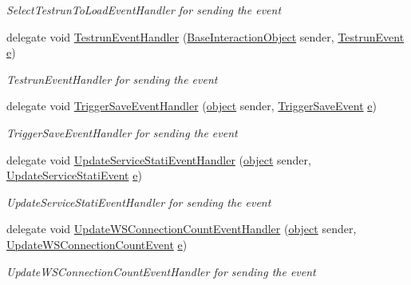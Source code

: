 \begin{DoxyCompactItemize}
\begin{DoxyCompactList}\small\item\em Select\+Testrun\+To\+Load\+Event\+Handler for sending the event \end{DoxyCompactList}\item 
delegate void \hyperlink{namespace_web_analyzer_1_1_events_ac749d30657662c0b107ea3e49caae8d9}{Testrun\+Event\+Handler} (\hyperlink{class_web_analyzer_1_1_u_i_1_1_interaction_objects_1_1_base_interaction_object}{Base\+Interaction\+Object} sender, \hyperlink{class_web_analyzer_1_1_events_1_1_testrun_event}{Testrun\+Event} \hyperlink{_u_i_2_h_t_m_l_resources_2js_2lib_2bootstrap_8min_8js_ab5902775854a8b8440bcd25e0fe1c120}{e})
\begin{DoxyCompactList}\small\item\em Testrun\+Event\+Handler for sending the event \end{DoxyCompactList}\item 
delegate void \hyperlink{namespace_web_analyzer_1_1_events_a8e8e2ff467a5d5522ce9d3df28198ccf}{Trigger\+Save\+Event\+Handler} (\hyperlink{_u_i_2_h_t_m_l_resources_2js_2lib_2underscore_8min_8js_aae18b7515bb2bc4137586506e7c0c903}{object} sender, \hyperlink{class_web_analyzer_1_1_events_1_1_trigger_save_event}{Trigger\+Save\+Event} \hyperlink{_u_i_2_h_t_m_l_resources_2js_2lib_2bootstrap_8min_8js_ab5902775854a8b8440bcd25e0fe1c120}{e})
\begin{DoxyCompactList}\small\item\em Trigger\+Save\+Event\+Handler for sending the event \end{DoxyCompactList}\item 
delegate void \hyperlink{namespace_web_analyzer_1_1_events_ab82c3a878b6c73019388a394527e6306}{Update\+Service\+Stati\+Event\+Handler} (\hyperlink{_u_i_2_h_t_m_l_resources_2js_2lib_2underscore_8min_8js_aae18b7515bb2bc4137586506e7c0c903}{object} sender, \hyperlink{class_web_analyzer_1_1_events_1_1_update_service_stati_event}{Update\+Service\+Stati\+Event} \hyperlink{_u_i_2_h_t_m_l_resources_2js_2lib_2bootstrap_8min_8js_ab5902775854a8b8440bcd25e0fe1c120}{e})
\begin{DoxyCompactList}\small\item\em Update\+Service\+Stati\+Event\+Handler for sending the event \end{DoxyCompactList}\item 
delegate void \hyperlink{namespace_web_analyzer_1_1_events_a60ab58d669ec03a2518a57dba5a59e0e}{Update\+W\+S\+Connection\+Count\+Event\+Handler} (\hyperlink{_u_i_2_h_t_m_l_resources_2js_2lib_2underscore_8min_8js_aae18b7515bb2bc4137586506e7c0c903}{object} sender, \hyperlink{class_web_analyzer_1_1_events_1_1_update_w_s_connection_count_event}{Update\+W\+S\+Connection\+Count\+Event} \hyperlink{_u_i_2_h_t_m_l_resources_2js_2lib_2bootstrap_8min_8js_ab5902775854a8b8440bcd25e0fe1c120}{e})
\begin{DoxyCompactList}\small\item\em Update\+W\+S\+Connection\+Count\+Event\+Handler for sending the event \end{DoxyCompactList}\end{DoxyCompactItemize}


